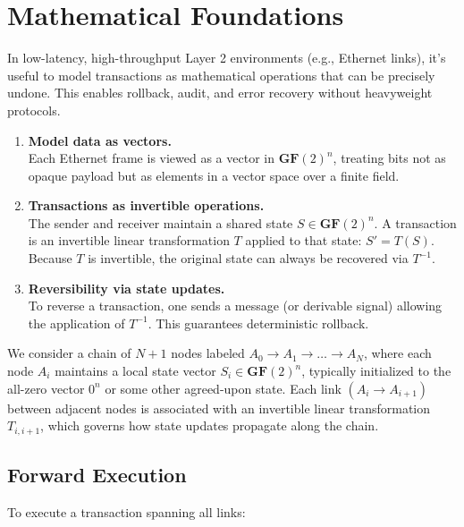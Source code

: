 \documentclass[../../../OAE-SPEC-MAIN.tex]{subfiles}
\begin{document}
\section{Mathematical Foundations}

In low-latency, high-throughput Layer 2 environments (e.g., Ethernet links), it's useful to model transactions as mathematical operations that can be precisely undone. This enables rollback, audit, and error recovery without heavyweight protocols.

\begin{enumerate}
\item \textbf{Model data as vectors.} \\
Each Ethernet frame is viewed as a vector in \(\mathbf{GF}(2)^n\), treating bits not as opaque payload but as elements in a vector space over a finite field.

\item \textbf{Transactions as invertible operations.} \\
The sender and receiver maintain a shared state \(S \in \mathbf{GF}(2)^n\). A transaction is an invertible linear transformation \(T\) applied to that state: \(S' = T(S)\). Because \(T\) is invertible, the original state can always be recovered via \(T^{-1}\).

\item \textbf{Reversibility via state updates.} \\
To reverse a transaction, one sends a message (or derivable signal) allowing the application of \(T^{-1}\). This guarantees deterministic rollback.
\end{enumerate}


We consider a chain of \(N+1\) nodes labeled \(A_0 \to A_1 \to \dots \to A_N\), where each node \(A_i\) maintains a local state vector \(S_i \in \mathbf{GF}(2)^n\), typically initialized to the all-zero vector \(0^n\) or some other agreed-upon state. Each link \((A_i \to A_{i+1})\) between adjacent nodes is associated with an invertible linear transformation \(T_{i,i+1}\), which governs how state updates propagate along the chain.


\subsection{Forward Execution}

To execute a transaction spanning all links:
\end{document}
